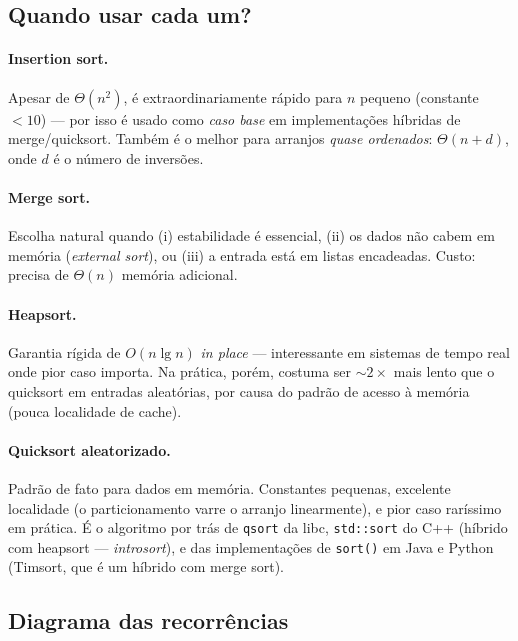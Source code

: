 \documentclass[9pt,a4paper]{extarticle}
\newcommand{\impt}[1]{\textcolor{important}{#1}}
\theoremstyle{definition}
\begin{document}
\subsection{Quando usar cada um?}

\paragraph{\impt{Insertion sort}.} Apesar de $\Theta(n^2)$, é
extraordinariamente rápido para $n$ pequeno (constante $< 10$) --- por
isso é usado como \textit{caso base} em implementações híbridas de
merge/quicksort. Também é o melhor para arranjos \textit{quase
ordenados}: $\Theta(n + d)$, onde $d$ é o número de inversões.

\paragraph{\impt{Merge sort}.} Escolha natural quando (i) estabilidade é
essencial, (ii) os dados não cabem em memória (\textit{external sort}),
ou (iii) a entrada está em listas encadeadas. Custo: precisa de
$\Theta(n)$ memória adicional.

\paragraph{\impt{Heapsort}.} Garantia rígida de $O(n\lg n)$ \textit{in
place} --- interessante em sistemas de tempo real onde pior caso
importa. Na prática, porém, costuma ser $\sim 2\times$ mais lento que o
quicksort em entradas aleatórias, por causa do padrão de acesso à
memória (pouca localidade de cache).

\paragraph{\impt{Quicksort aleatorizado}.} Padrão de fato para dados em
memória. Constantes pequenas, excelente localidade (o particionamento
varre o arranjo linearmente), e pior caso raríssimo em prática. É o
algoritmo por trás de \texttt{qsort} da libc, \texttt{std::sort} do C++
(híbrido com heapsort --- \textit{introsort}), e das implementações
de \texttt{sort()} em Java e Python (Timsort, que é um híbrido com merge
sort).

\subsection{Diagrama das recorrências}
\end{document}
